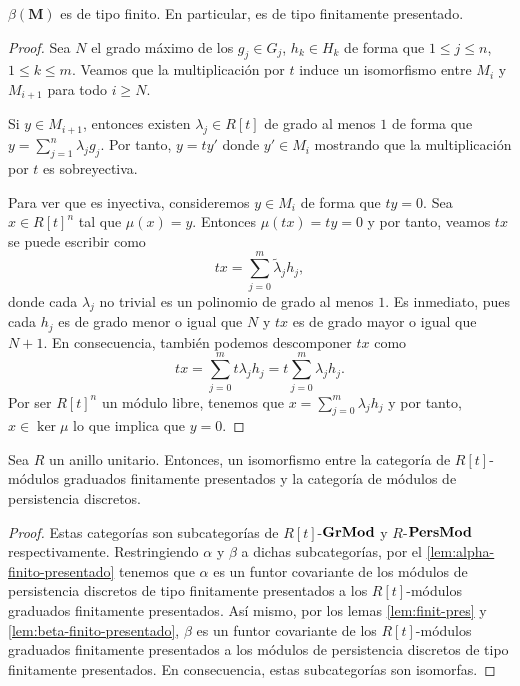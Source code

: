 \begin{lema}
	\label{lem:beta-finito-presentado}
	\(\beta(\mathbf{M})\) es de tipo finito. En particular, es de tipo finitamente presentado.
\end{lema}
\begin{proof}
	Sea \(N\) el grado máximo de los \(g_j \in G_j\), \(h_k \in H_k\) de forma que \(1 \leq j \leq n\), \(1 \leq k \leq m\). Veamos que la multiplicación por \(t\) induce un isomorfismo entre \(M_i\) y \(M_{i+1}\) para todo \(i \geq N\).
	
	Si \(y \in M_{i+1}\), entonces existen \(\lambda_j \in R[t]\) de grado al menos \(1\) de forma que \(y = \sum_{j=1}^n \lambda_j g_j\). Por tanto, \(y = ty'\) donde \(y' \in M_i\) mostrando que la multiplicación por \(t\) es sobreyectiva.
	
	Para ver que es inyectiva, consideremos \(y \in M_i\) de forma que \(ty = 0\). Sea \(x \in R[t]^n\) tal que \(\mu(x) = y\). Entonces \(\mu(tx) = ty = 0\) y por tanto, veamos \(tx\) se puede escribir como
	\[
		tx = \sum_{j=0}^m \tilde{\lambda}_j h_j,
	\]
	donde cada \(\lambda_j\) no trivial es un polinomio de grado al menos \(1\). Es inmediato, pues cada \(h_j\) es de grado menor o igual que \(N\) y \(tx\) es de grado mayor o igual que \(N+1\). En consecuencia, también podemos descomponer \(tx\) como
	\[
		tx = \sum_{j=0}^m t \lambda_j h_j = t \sum_{j=0}^m \lambda_j h_j.
	\]
	Por ser \(R[t]^n\) un módulo libre, tenemos que \( x = \sum_{j=0}^m \lambda_j h_j\) y por tanto, \(x \in \ker \mu\) lo que implica que \(y = 0\).
\end{proof}

\begin{teorema}
	\label{teo:correspondence}
	Sea \( R \) un anillo unitario. Entonces, un isomorfismo entre la categoría de \(R[t]\)-módulos graduados finitamente presentados y la categoría de módulos de persistencia discretos.
\end{teorema}
\begin{proof}
	Estas categorías son subcategorías de \(R[t]\)-\(\mathbf{GrMod}\) y \(R\)-\(\mathbf{PersMod}\) respectivamente. Restringiendo \(\alpha\) y \(\beta\) a dichas subcategorías, por el \autoref{lem:alpha-finito-presentado} tenemos que \(\alpha\) es un funtor covariante de los módulos de persistencia discretos de tipo finitamente presentados a los \(R[t]\)-módulos graduados finitamente presentados. Así mismo, por los lemas \ref{lem:finit-pres} y \ref{lem:beta-finito-presentado}, \(\beta\) es un funtor covariante de los \(R[t]\)-módulos graduados finitamente presentados a los módulos de persistencia discretos de tipo finitamente presentados. En consecuencia, estas subcategorías son isomorfas.
\end{proof}

